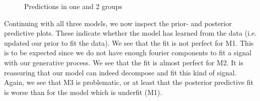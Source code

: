 \documentclass{article}
\begin{document}
\begin{figure}[ht]
    \centering
    \quad
    \quad
    \caption{Predictions in one and 2 groups}
\end{figure}

Continuing with all three models, we now inspect the prior- and posterior predictive plots. These indicate whether the model has learned from the data (i.e. updated our prior to fit the data). We see that the fit is not perfect for M1. This is to be expected since we do not have enough fourier components to fit a signal with our generative process. We see that the fit is almost perfect for M2. It is reassuring that our model can indeed decompose and fit this kind of signal. Again, we see that M3 is problematic, or at least that the posterior predictive fit is worse than for the model which is underfit (M1). 
\end{document}
